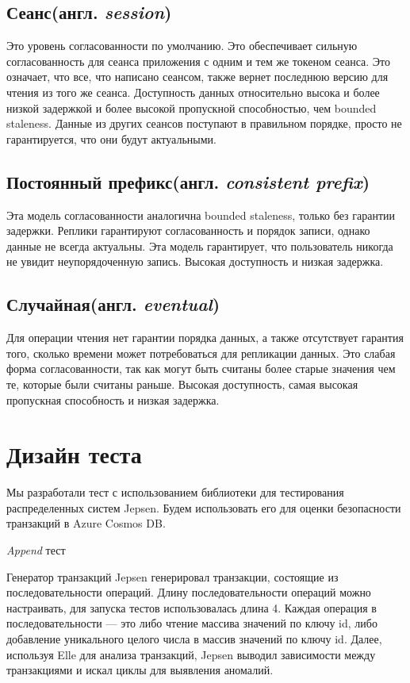 \documentclass[12pt,  openany]{book}
\begin{document}
\subsection{Сеанс(англ.  \textit{session})}
Это уровень согласованности по умолчанию. Это обеспечивает сильную согласованность для сеанса приложения с одним и тем же токеном сеанса. Это означает, что все, что написано сеансом, также вернет последнюю версию для чтения из того же сеанса. Доступность данных относительно высока и более низкой задержкой и более высокой пропускной способностью, чем bounded staleness. Данные из других сеансов поступают в правильном порядке, просто не гарантируется, что они будут актуальными.
\subsection{Постоянный префикс(англ.  \textit{consistent prefix})}
Эта модель согласованности аналогична bounded staleness, только без гарантии задержки. Реплики гарантируют согласованность и порядок записи, однако данные не всегда актуальны. Эта модель гарантирует, что пользователь никогда не увидит неупорядоченную запись. Высокая доступность и низкая задержка.
\subsection{Случайная(англ.  \textit{eventual})}
Для операции чтения нет гарантии порядка данных, а также отсутствует гарантия того, сколько времени может потребоваться для репликации данных.  Это слабая форма согласованности, так как могут быть считаны более старые значения чем те, которые были считаны раньше.
Высокая доступность, самая высокая пропускная способность и низкая задержка.

\section{Дизайн теста}
Мы разработали тест с использованием библиотеки для тестирования распределенных систем Jepsen. Будем использовать его для оценки безопасности транзакций в Azure Cosmos DB. 
\par
\textit{Append} тест
\par
Генератор транзакций Jepsen генерировал транзакции, состоящие из последовательности операций. Длину последовательности операций можно настраивать, для запуска тестов использовалась длина 4. Каждая операция в последовательности --- это либо чтение массива значений по ключу id, либо добавление уникального целого числа в массив значений по ключу id. 
Далее, используя Elle для анализа транзакций, Jepsen выводил зависимости между транзакциями и искал циклы для выявления аномалий. 
\end{document}
